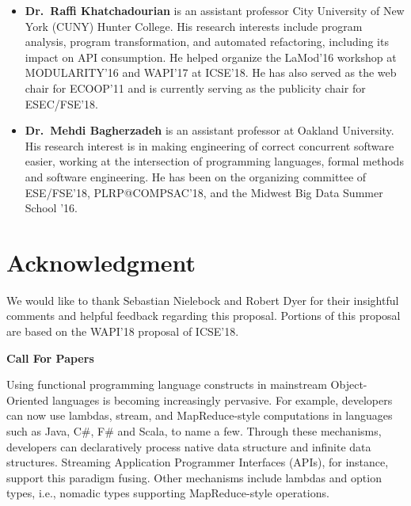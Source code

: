 \documentclass[10pt, conference]{IEEEtran}
\begin{document}
\begin{itemize}

	\item \textbf{Dr.~Raffi Khatchadourian} is an assistant professor City University of New York (CUNY) Hunter College. His research interests include program analysis, program transformation, and automated refactoring, including its impact on API consumption. He helped organize the LaMod'16 workshop at MODULARITY'16 and WAPI'17 at ICSE'18. He has also served as the web chair for ECOOP'11 and is currently serving as the publicity chair for ESEC/FSE'18.

	\item \textbf{Dr.~Mehdi Bagherzadeh} is an assistant professor at Oakland University. His research interest is in making engineering of correct concurrent software easier, working at the intersection of programming languages, formal methods and software engineering. He has been on the organizing committee of ESE/FSE'18, PLRP@COMPSAC'18, and the Midwest Big Data Summer School '16.

\end{itemize}

\section*{Acknowledgment}

We would like to thank Sebastian Nielebock and Robert Dyer for their insightful comments and helpful feedback regarding this proposal. Portions of this proposal are based on the WAPI'18 proposal of ICSE'18.


% 


\newpage
\onecolumn

\begin{center}
	\textbf{Call For Papers}
\end{center}

Using functional programming language constructs in mainstream Object-Oriented languages is becoming increasingly pervasive. For example, developers can now use lambdas, stream, and MapReduce-style computations in languages such as Java, C\#, F\# and Scala, to name a few. Through these mechanisms, developers can declaratively process native data structure 
and infinite data structures. Streaming Application Programmer Interfaces (APIs), for instance,
support this paradigm fusing. Other mechanisms include lambdas
and option types, i.e., nomadic types supporting MapReduce-style operations.
\end{document}

